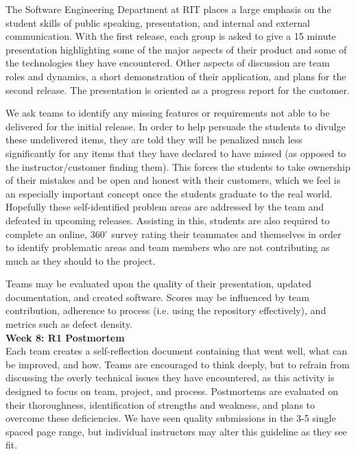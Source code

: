 \documentclass[conference]{IEEEtran}
\begin{document}
The Software Engineering Department at RIT places a large emphasis on the student skills of public speaking, presentation, and internal and external communication. With the first release, each group is asked to give a 15 minute presentation highlighting some of the major aspects of their product and some of the technologies they have encountered. Other aspects of discussion are team roles and dynamics, a short demonstration of their application, and plans for the second release. The presentation is oriented as a progress report for the customer.

We ask teams to identify any missing features or requirements not able to be delivered for the initial release. In order to help persuade the students to divulge these undelivered items, they are told they will be penalized much less significantly for any items that they have declared to have missed (as opposed to the instructor/customer finding them). This forces the students to take ownership of their mistakes and be open and honest with their customers, which we feel is an especially important concept once the students graduate to the real world. Hopefully these self-identified problem areas are addressed by the team and defeated in upcoming releases. Assisting in this, students are also required to complete an online, 360$^{\circ}$ survey rating their teammates and themselves in order to identify problematic areas and team members who are not contributing as much as they should to the project.

Teams may be evaluated upon the quality of their presentation, updated documentation, and created software.  Scores may be influenced by team contribution, adherence to process (i.e. using the repository effectively), and metrics such as defect density.\\

\textbf{Week 8: R1 Postmortem}\\
Each team creates a self-reflection document containing that went well, what can be improved, and how. Teams are encouraged to think deeply, but to refrain from discussing the overly technical issues they have encountered, as this activity is designed to focus on team, project, and process. Postmortems are evaluated on their thoroughness, identification of strengths and weakness, and plans to overcome these deficiencies. We have seen quality submissions in the 3-5 single spaced page range, but individual instructors may alter this guideline as they see fit.\\
\end{document}
